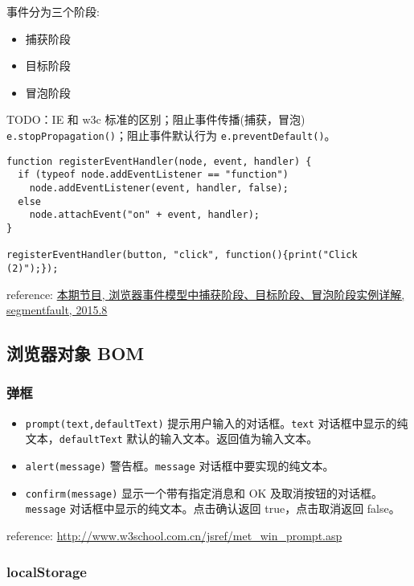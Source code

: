 事件分为三个阶段:

\begin{itemize}
\item 捕获阶段
\item 目标阶段
\item 冒泡阶段
\end{itemize}

TODO：IE 和 w3c 标准的区别；阻止事件传播(捕获，冒泡) \texttt{e.stopPropagation()}；阻止事件默认行为 \texttt{e.preventDefault()}。

\begin{verbatim}function registerEventHandler(node, event, handler) {
  if (typeof node.addEventListener == "function")
    node.addEventListener(event, handler, false);
  else
    node.attachEvent("on" + event, handler);
}

registerEventHandler(button, "click", function(){print("Click (2)");});
\end{verbatim}

reference: \href{http://segmentfault.com/a/1190000003482372}{本期节目, 浏览器事件模型中捕获阶段、目标阶段、冒泡阶段实例详解, segmentfault, 2015.8}

\subsection{浏览器对象 BOM}\hypertarget{bom}{}\label{bom}

\subsubsection{弹框}\hypertarget{section-9}{}\label{section-9}

\begin{itemize}
\item \texttt{prompt(text,defaultText)} 提示用户输入的对话框。\texttt{text} 对话框中显示的纯文本，\texttt{defaultText} 默认的输入文本。返回值为输入文本。
\item \texttt{alert(message)} 警告框。\texttt{message} 对话框中要实现的纯文本。
\item \texttt{confirm(message)} 显示一个带有指定消息和 OK 及取消按钮的对话框。\texttt{message} 对话框中显示的纯文本。点击确认返回 true，点击取消返回 false。
\end{itemize}

reference: \href{http://www.w3school.com.cn/jsref/met\_win\_prompt.asp}{http://www.w3school.com.cn/jsref/met\_win\_prompt.asp}

\subsubsection{localStorage}\hypertarget{localstorage}{}\label{localstorage}

